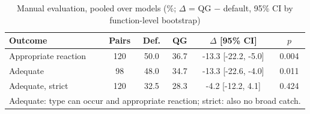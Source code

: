 \begin{table}[t]
  \centering
  \scriptsize
  \setlength{\tabcolsep}{2.5pt}
  \caption{Manual evaluation, pooled over models (\%; $\Delta$ = QG $-$ default, 95\% CI by function-level bootstrap)}
  \label{tab:manual}
  \begin{tabular}{lccccc}
    \toprule
    Outcome & Pairs & Def. & QG & $\Delta$ [95\% CI] & $p$ \\
    \midrule
    Appropriate reaction & 120 & 50.0 & 36.7 & -13.3 [-22.2, -5.0] & 0.004 \\
    Adequate & 98 & 48.0 & 34.7 & -13.3 [-22.6, -4.0] & 0.011 \\
    Adequate, strict & 120 & 32.5 & 28.3 & -4.2 [-12.2, 4.1] & 0.424 \\
    \bottomrule
    \multicolumn{6}{l}{Adequate: type can occur and appropriate reaction; strict: also no broad catch.}
  \end{tabular}
\end{table}
